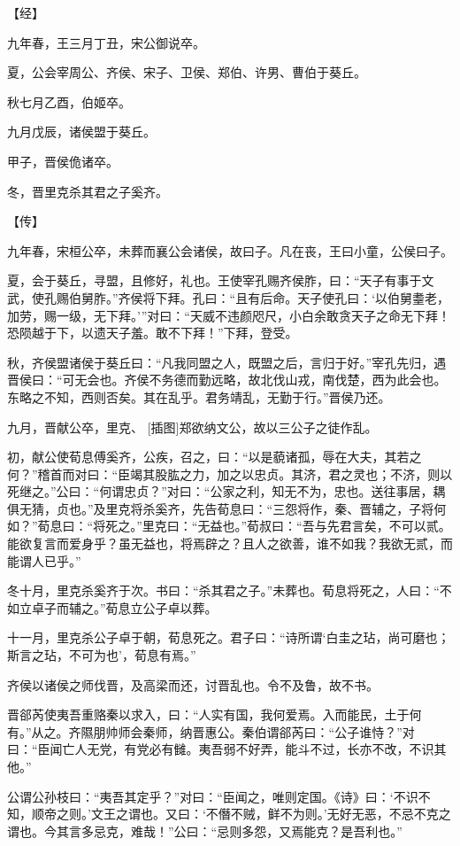 \documentclass[a4paper,12pt,UTF8,twoside]{ctexbook}
\begin{document}
【经】

九年春，王三月丁丑，宋公御说卒。

夏，公会宰周公、齐侯、宋子、卫侯、郑伯、许男、曹伯于葵丘。

秋七月乙酉，伯姬卒。

九月戊辰，诸侯盟于葵丘。

甲子，晋侯佹诸卒。

冬，晋里克杀其君之子奚齐。

【传】

九年春，宋桓公卒，未葬而襄公会诸侯，故曰子。凡在丧，王曰小童，公侯曰子。

夏，会于葵丘，寻盟，且修好，礼也。王使宰孔赐齐侯胙，曰：“天子有事于文武，使孔赐伯舅胙。”齐侯将下拜。孔曰：“且有后命。天子使孔曰：‘以伯舅耋老，加劳，赐一级，无下拜。’”对曰：“天威不违颜咫尺，小白余敢贪天子之命无下拜！恐陨越于下，以遗天子羞。敢不下拜！”下拜，登受。

秋，齐侯盟诸侯于葵丘曰：“凡我同盟之人，既盟之后，言归于好。”宰孔先归，遇晋侯曰：“可无会也。齐侯不务德而勤远略，故北伐山戎，南伐楚，西为此会也。东略之不知，西则否矣。其在乱乎。君务靖乱，无勤于行。”晋侯乃还。

九月，晋献公卒，里克、 [插图]郑欲纳文公，故以三公子之徒作乱。

初，献公使荀息傅奚齐，公疾，召之，曰：“以是藐诸孤，辱在大夫，其若之何？”稽首而对曰：“臣竭其股肱之力，加之以忠贞。其济，君之灵也；不济，则以死继之。”公曰：“何谓忠贞？”对曰：“公家之利，知无不为，忠也。送往事居，耦俱无猜，贞也。”及里克将杀奚齐，先告荀息曰：“三怨将作，秦、晋辅之，子将何如？”荀息曰：“将死之。”里克曰：“无益也。”荀叔曰：“吾与先君言矣，不可以贰。能欲复言而爱身乎？虽无益也，将焉辟之？且人之欲善，谁不如我？我欲无贰，而能谓人已乎。”

冬十月，里克杀奚齐于次。书曰：“杀其君之子。”未葬也。荀息将死之，人曰：“不如立卓子而辅之。”荀息立公子卓以葬。

十一月，里克杀公子卓于朝，荀息死之。君子曰：“诗所谓‘白圭之玷，尚可磨也；斯言之玷，不可为也’，荀息有焉。”

齐侯以诸侯之师伐晋，及高梁而还，讨晋乱也。令不及鲁，故不书。

晋郤芮使夷吾重赂秦以求入，曰：“人实有国，我何爱焉。入而能民，土于何有。”从之。齐隰朋帅师会秦师，纳晋惠公。秦伯谓郤芮曰：“公子谁恃？”对曰：“臣闻亡人无党，有党必有雠。夷吾弱不好弄，能斗不过，长亦不改，不识其他。”

公谓公孙枝曰：“夷吾其定乎？”对曰：“臣闻之，唯则定国。《诗》曰：‘不识不知，顺帝之则。’文王之谓也。又曰：‘不僭不贼，鲜不为则。’无好无恶，不忌不克之谓也。今其言多忌克，难哉！”公曰：“忌则多怨，又焉能克？是吾利也。”
\end{document}
